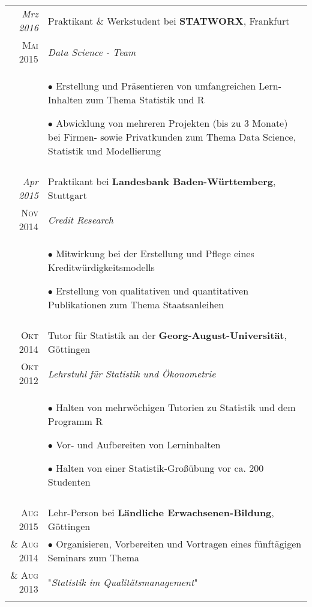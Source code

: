 \documentclass[a4paper,10pt]{article} %
\begin{document}
\begin{tabular}{r|p{11cm}}


\emph{Mrz 2016} & Praktikant \& Werkstudent bei \textbf{STATWORX}, Frankfurt\\
\textsc{Mai 2015} & \emph{Data Science - Team} \\
& \footnotesize{
$\bullet$ Erstellung und Präsentieren von umfangreichen Lern-Inhalten zum Thema Statistik und R

$\bullet$ Abwicklung von mehreren Projekten (bis zu 3 Monate) bei Firmen- sowie Privatkunden zum Thema Data Science, Statistik und Modellierung}\\
\multicolumn{2}{c}{} \\



\emph{Apr 2015} & Praktikant bei \textbf{Landesbank Baden-Württemberg}, Stuttgart\\
\textsc{Nov 2014} & \emph{Credit Research} \\
& \footnotesize{
$\bullet$ Mitwirkung bei der Erstellung und Pflege eines Kreditwürdigkeitsmodells

$\bullet$ Erstellung von qualitativen und quantitativen Publikationen zum Thema Staatsanleihen}\\
\multicolumn{2}{c}{} \\


\textsc{Okt 2014} & Tutor für Statistik an der \textbf{Georg-August-Universität}, Göttingen\\
\textsc{Okt 2012} & \emph{Lehrstuhl für Statistik und Ökonometrie}\\
& \footnotesize{
$\bullet$ Halten von mehrwöchigen Tutorien zu Statistik und dem Programm R

$\bullet$ Vor- und Aufbereiten von Lerninhalten

$\bullet$ Halten von einer Statistik-Großübung vor ca. 200 Studenten}\\
\multicolumn{2}{c}{} \\


\textsc{Aug 2015} & Lehr-Person bei \textbf{Ländliche Erwachsenen-Bildung}, Göttingen\\
\textsc{ \& Aug 2014}& $\bullet$ \footnotesize{Organisieren, Vorbereiten und Vortragen eines fünftägigen Seminars zum Thema} \\

\textsc{\& Aug 2013}& "\footnotesize{\emph{Statistik im Qualitätsmanagement}"}\\
\multicolumn{2}{c}{} \\


\end{tabular}
\end{document}
